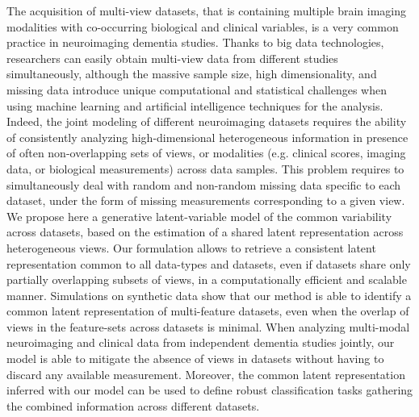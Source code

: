 The acquisition of multi-view datasets, that is containing multiple brain imaging modalities with co-occurring biological and clinical variables, is a very common practice in neuroimaging dementia studies.
Thanks to big data technologies, researchers can easily obtain multi-view data from different studies simultaneously,
although the massive sample size, high dimensionality, and missing data introduce unique computational and statistical challenges when using machine learning and artificial intelligence techniques for the analysis.
Indeed, the joint modeling of different neuroimaging datasets requires the ability of consistently analyzing high-dimensional heterogeneous information in presence of often non-overlapping sets of views, or modalities (e.g. clinical scores, imaging data, or biological measurements) across data samples.
This problem requires to simultaneously deal with random and non-random missing data specific to each dataset, under the form of missing measurements corresponding to a given view.
%
We propose here a generative latent-variable model of the common variability across datasets, based on the estimation of a shared latent representation across heterogeneous views.
Our formulation allows to retrieve a consistent latent representation common to all data-types and datasets, even if datasets share only partially overlapping subsets of views, in a computationally efficient and scalable manner.
%
Simulations on synthetic data show that our method is able to identify a common latent representation of multi-feature datasets, even when the overlap of views in the feature-sets across datasets is minimal.
%
When analyzing multi-modal neuroimaging and clinical data from independent dementia studies jointly, our model is able to mitigate the absence of views in datasets without having to discard any available measurement.
Moreover, the common latent representation inferred with our model can be used to define robust classification tasks gathering the combined information across different datasets.
